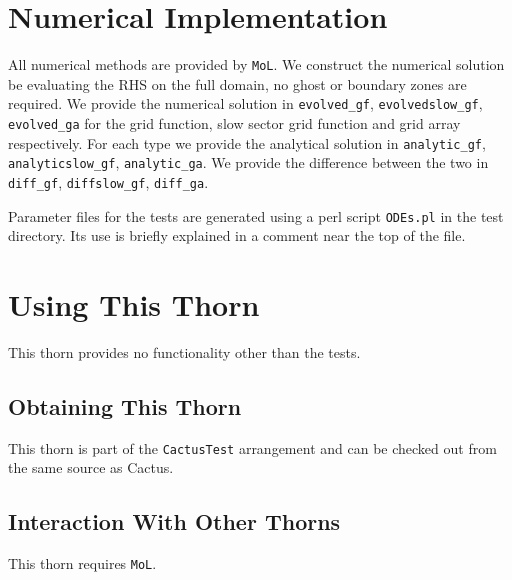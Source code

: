 \section{Numerical Implementation}
All numerical methods are provided by \texttt{MoL}. We construct the
numerical solution be evaluating the RHS on the full domain, no ghost or
boundary zones are required. We provide the numerical solution in
\texttt{evolved\_gf}, \texttt{evolvedslow\_gf}, \texttt{evolved\_ga} for the
grid function, slow sector grid function and grid array respectively. For each
type we provide the analytical solution in \texttt{analytic\_gf},
\texttt{analyticslow\_gf}, \texttt{analytic\_ga}. We provide the difference
between the two in \texttt{diff\_gf}, \texttt{diffslow\_gf},
\texttt{diff\_ga}.

Parameter files for the tests are generated using a perl script
\texttt{ODEs.pl} in the test directory. Its use is briefly explained in a
comment near the top of the file.

\section{Using This Thorn}
This thorn provides no functionality other than the tests.

\subsection{Obtaining This Thorn}
This thorn is part of the \texttt{CactusTest} arrangement and can be checked
out from the same source as Cactus.

\subsection{Interaction With Other Thorns}
This thorn requires \texttt{MoL}.



